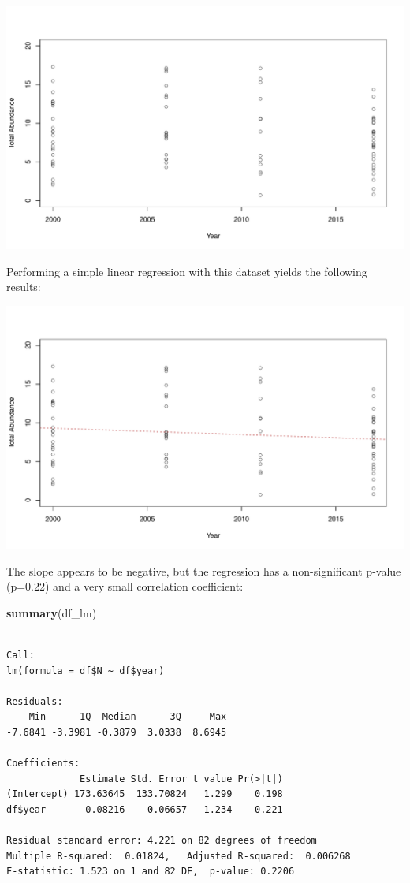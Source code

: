 \documentclass[
]{book}
\newenvironment{Shaded}{\begin{snugshade}}{\end{snugshade}}
\newcommand{\KeywordTok}[1]{\textcolor[rgb]{0.13,0.29,0.53}{\textbf{#1}}}
\newcommand{\NormalTok}[1]{#1}
\begin{document}
\includegraphics{figures/unnamed-chunk-319-1.pdf}

Performing a simple linear regression with this dataset yields the following results:

\includegraphics{figures/unnamed-chunk-320-1.pdf}

The slope appears to be negative, but the regression has a non-significant p-value (p=0.22) and a very small correlation coefficient:

\begin{Shaded}
\begin{Highlighting}[]
\KeywordTok{summary}\NormalTok{(df_lm)}
\end{Highlighting}
\end{Shaded}

\begin{verbatim}

Call:
lm(formula = df$N ~ df$year)

Residuals:
    Min      1Q  Median      3Q     Max 
-7.6841 -3.3981 -0.3879  3.0338  8.6945 

Coefficients:
             Estimate Std. Error t value Pr(>|t|)
(Intercept) 173.63645  133.70824   1.299    0.198
df$year      -0.08216    0.06657  -1.234    0.221

Residual standard error: 4.221 on 82 degrees of freedom
Multiple R-squared:  0.01824,   Adjusted R-squared:  0.006268 
F-statistic: 1.523 on 1 and 82 DF,  p-value: 0.2206
\end{verbatim}
\end{document}

